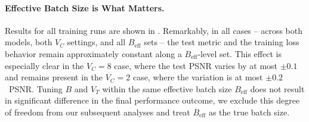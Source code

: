 


\paragraph{Effective Batch Size is What Matters.} Results for all training runs are shown in . Remarkably, in all cases -- across both models, both $V_C$ settings, and all $B_{\text{eff}}$ sets -- the test metric and the training loss behavior remain approximately constant along a $B_{\text{eff}}$-level set. This effect is especially clear in the $V_C = 8$ case, where the test PSNR varies by at most $\pm 0.1$ and remains present in the $V_C = 2$ case, where the variation is at most $\pm 0.2$~PSNR. Tuning $B$ and $V_T$ within the same effective batch size $B_{\text{eff}}$ does not result in significant difference in the final performance outcome, we exclude this degree of freedom from our subsequent analyses and treat $B_{\text{eff}}$ as the true batch size. 





